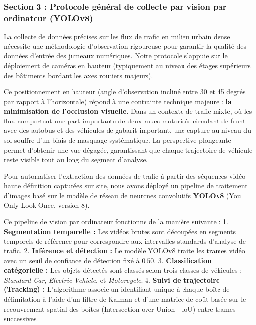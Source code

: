 \documentclass[10pt, a4paper]{article}
\begin{document}
\subsubsection{Section 3 : Protocole général de collecte par vision par
ordinateur
(YOLOv8)}\label{section-3-protocole-guxe9nuxe9ral-de-collecte-par-vision-par-ordinateur-yolov8}

La collecte de données précises sur les flux de trafic en milieu urbain
dense nécessite une méthodologie d'observation rigoureuse pour garantir
la qualité des données d'entrée des jumeaux numériques. Notre protocole
s'appuie sur le déploiement de caméras en hauteur (typiquement au niveau
des étages supérieurs des bâtiments bordant les axes routiers majeurs).

Ce positionnement en hauteur (angle d'observation incliné entre 30 et 45
degrés par rapport à l'horizontale) répond à une contrainte technique
majeure : \textbf{la minimisation de l'occlusion visuelle}. Dans un
contexte de trafic mixte, où les flux comportent une part importante de
deux-roues motorisés circulant de front avec des autobus et des
véhicules de gabarit important, une capture au niveau du sol souffre
d'un biais de masquage systématique. La perspective plongeante permet
d'obtenir une vue dégagée, garantissant que chaque trajectoire de
véhicule reste visible tout au long du segment d'analyse.

Pour automatiser l'extraction des données de trafic à partir des
séquences vidéo haute définition capturées sur site, nous avons déployé
un pipeline de traitement d'images basé sur le modèle de réseau de
neurones convolutifs \textbf{YOLOv8} (You Only Look Once, version 8).

Ce pipeline de vision par ordinateur fonctionne de la manière suivante :
1. \textbf{Segmentation temporelle :} Les vidéos brutes sont découpées
en segments temporels de référence pour correspondre aux intervalles
standards d'analyse de trafic. 2. \textbf{Inférence et détection :} Le
modèle YOLOv8 traite les trames vidéo avec un seuil de confiance de
détection fixé à \(0.50\). 3. \textbf{Classification catégorielle :} Les
objets détectés sont classés selon trois classes de véhicules :
\emph{Standard Car}, \emph{Electric Vehicle}, et \emph{Motorcycle}. 4.
\textbf{Suivi de trajectoire (Tracking) :} L'algorithme associe un
identifiant unique à chaque boîte de délimitation à l'aide d'un filtre
de Kalman et d'une matrice de coût basée sur le recouvrement spatial des
boîtes (Intersection over Union - IoU) entre trames successives.
\end{document}
